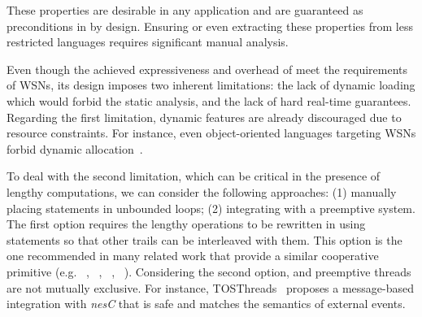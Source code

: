 These properties are desirable in any application and are guaranteed as 
preconditions in \CEU by design.
Ensuring or even extracting these properties from less restricted languages 
requires significant manual analysis.

Even though the achieved expressiveness and overhead of \CEU meet the 
requirements of WSNs, its design imposes two inherent limitations:
the lack of dynamic loading which would forbid the static analysis,
and the lack of hard real-time guarantees.
%
Regarding the first limitation, dynamic features are already discouraged due to 
resource constraints.
For instance, even object-oriented languages targeting WSNs forbid dynamic 
allocation~\cite{wsn.flowtalk,wsn.virgil}.

To deal with the second limitation, which can be critical in the presence of 
lengthy computations, we can consider the following approaches:
(1) manually placing  statements in unbounded loops;
(2) integrating \CEU with a preemptive system.
%
The first option requires the lengthy operations to be rewritten in \CEU using
 statements so that other trails can be interleaved with them.
This option is the one recommended in many related work that provide a similar 
cooperative primitive (e.g. ~\cite{esterel.primer}, 
~\cite{wsn.protothreads}, ~\cite{wsn.sol}, 
~\cite{wsn.nesc}).
%
Considering the second option, \CEU and preemptive threads are not mutually 
exclusive.
For instance, TOSThreads~\cite{wsn.tosthreads} proposes a message-based 
integration with \emph{nesC} that is safe and matches the semantics of \CEU 
external events.


